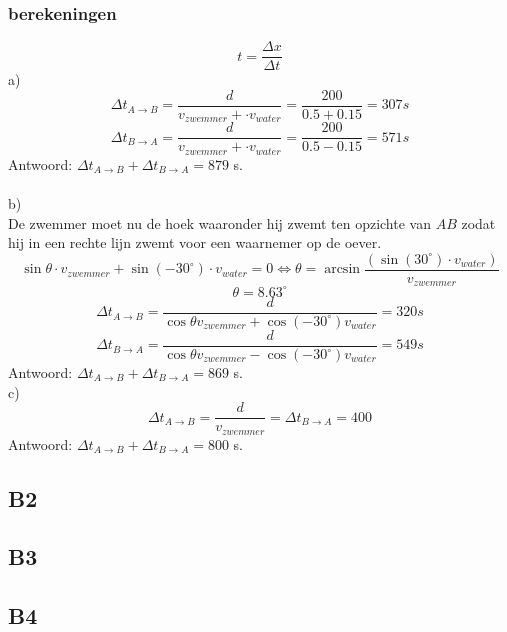 \documentclass[10pt,a4paper]{article}
\begin{document}
\subsubsection*{berekeningen}
\[
t = \frac{\Delta x}{\Delta t}
\]
a)\\
\[
\Delta t_{A\rightarrow B} = \frac{d}{v_{zwemmer} + \cdot v_{water}} = \frac{200}{0.5+0.15} = 307 s
\]
\[
\Delta t_{B\rightarrow A} = \frac{d}{v_{zwemmer} + \cdot v_{water}} = \frac{200}{0.5-0.15} = 571 s
\]
Antwoord:
$\Delta t_{A\rightarrow B} + \Delta t_{B\rightarrow A} = 879$ s.\\\\
b)\\
De zwemmer moet nu de hoek waaronder hij zwemt ten opzichte van $AB$ zodat hij in een rechte lijn zwemt voor een waarnemer op de oever.
\[
\sin{\theta}\cdot v_{zwemmer} + \sin{(-30^\circ)}\cdot v_{water} = 0 \Leftrightarrow \theta=\arcsin{\frac{(\sin{(30^\circ)}\cdot v_{water})}{v_{zwemmer}}}
\]
\[
\theta = 8.63^\circ
\]
\[
\Delta t_{A\rightarrow B} = \frac{d}{\cos{\theta}v_{zwemmer} + \cos{(-30^\circ)}v_{water}}=320 s
\]
\[
\Delta t_{B\rightarrow A} = \frac{d}{\cos{\theta}v_{zwemmer} - \cos{(-30^\circ)}v_{water}}=549 s
\]
Antwoord:
$\Delta t_{A\rightarrow B} + \Delta t_{B\rightarrow A} = 869$ s.\\
c)\\
\[
\Delta t_{A\rightarrow B} = \frac{d}{v_{zwemmer}} = \Delta t_{B\rightarrow A} = 400
\]
Antwoord:
$\Delta t_{A\rightarrow B} + \Delta t_{B\rightarrow A} = 800$ s.\\

\subsection{B2}

\subsection{B3}

\subsection{B4}
\end{document}
